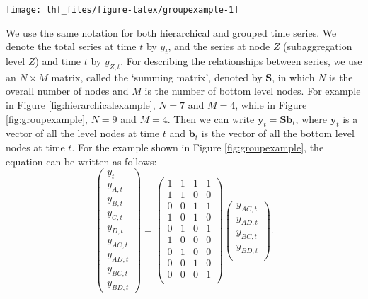 \documentclass[11pt,a4paper,]{article}
\let\origfigure\figure
\let\endorigfigure\endfigure
\renewenvironment{figure}[1][2] {
    \expandafter\origfigure\expandafter[!htbp]
} {
    \endorigfigure
}
\begin{document}
\begin{figure}

{\centering \texttt{[image: lhf\_files/figure-latex/groupexample-1]} 

}

\caption{An example of a two level grouped structure.}\label{fig:groupexample}
\end{figure}

We use the same notation \autocite[following][]{fpp2} for both
hierarchical and grouped time series. We denote the total series at time
\(t\) by \(y_t\), and the series at node \(Z\) (subaggregation level
\(Z\)) and time \(t\) by \(y_{Z,t}\). For describing the relationships
between series, we use an \(N\times M\) matrix, called the `summing
matrix', denoted by \(\bm{S}\), in which \(N\) is the overall number of
nodes and \(M\) is the number of bottom level nodes. For example in
Figure \ref{fig:hierarchicalexample}, \(N = 7\) and \(M = 4\), while in
Figure \ref{fig:groupexample}, \(N=9\) and \(M=4\). Then we can write
\(\bm{y}_t=\bm{S}\bm{b}_t\), where \(\bm{y}_t\) is a vector of all the
level nodes at time \(t\) and \(\bm{b}_t\) is the vector of all the
bottom level nodes at time \(t\). For the example shown in Figure
\ref{fig:groupexample}, the equation can be written as follows:
\begin{equation}\label{eq:Smatrixexample}
  \begin{pmatrix}
    y_{t}\\y_{A,t}\\y_{B,t}\\y_{C,t}\\y_{D,t}\\y_{AC,t}\\y_{AD,t}\\y_{BC,t}\\y_{BD,t}
  \end{pmatrix} =
  \begin{pmatrix}
    1&1&1&1\\1&1&0&0\\0&0&1&1\\1&0&1&0\\0&1&0&1\\1&0&0&0\\0&1&0&0\\0&0&1&0\\0&0&0&1\\
  \end{pmatrix}
  \begin{pmatrix}
    y_{AC,t}\\y_{AD,t}\\y_{BC,t}\\y_{BD,t}\\
  \end{pmatrix}.
\end{equation}
\end{document}

